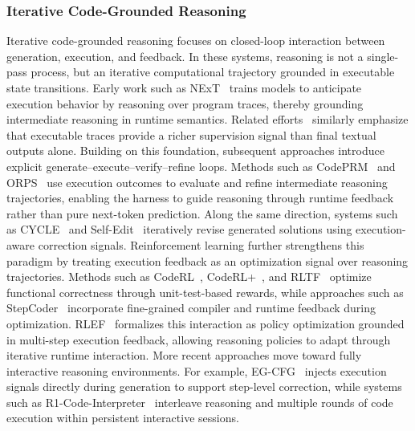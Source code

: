\documentclass{llmxive}
\begin{document}
\subsubsection{Iterative Code-Grounded Reasoning}
Iterative code-grounded reasoning focuses on closed-loop
interaction between generation, execution, and feedback.
In these systems, reasoning is not a single-pass process, but an
iterative computational trajectory grounded in executable state
transitions.
Early work such as NExT~\cite{ni2024next} trains models to
anticipate execution behavior by reasoning over program traces,
thereby grounding intermediate reasoning in runtime semantics.
Related efforts~\cite{armengol2025cannot} similarly emphasize
that executable traces provide a richer supervision signal than
final textual outputs alone.
Building on this foundation, subsequent approaches introduce
explicit generate--execute--verify--refine loops.
Methods such as CodePRM~\cite{li2025codeprm} and
ORPS~\cite{yu2024reasoning} use execution outcomes to evaluate
and refine intermediate reasoning trajectories, enabling the
harness to guide reasoning through runtime feedback rather than
pure next-token prediction.
Along the same direction, systems such as
CYCLE~\cite{ding2024cycle} and
Self-Edit~\cite{zhang2023self} iteratively revise generated
solutions using execution-aware correction signals.
Reinforcement learning further strengthens this paradigm by
treating execution feedback as an optimization signal over
reasoning trajectories.
Methods such as CodeRL~\cite{le2022coderl},
CodeRL+~\cite{jiang2025coderl+}, and
RLTF~\cite{liu2023rltf} optimize functional correctness through
unit-test-based rewards, while approaches such as
StepCoder~\cite{dou2024stepcoder} incorporate fine-grained
compiler and runtime feedback during optimization.
RLEF~\cite{gehring2024rlef} formalizes this interaction as
policy optimization grounded in multi-step execution feedback,
allowing reasoning policies to adapt through iterative runtime
interaction.
More recent approaches move toward fully interactive reasoning
environments.
For example, EG-CFG~\cite{lavon2025execution} injects execution
signals directly during generation to support step-level
correction, while systems such as
R1-Code-Interpreter~\cite{chen2025r1} interleave reasoning and
multiple rounds of code execution within persistent interactive
sessions.
\end{document}
